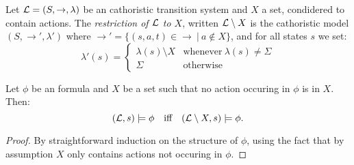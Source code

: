 

\begin{definition}
Let $\mathcal{L} = (S, \rightarrow, \lambda)$ be an cathoristic transition system
and $X$ a set, condidered to contain actions. The \emph{restriction of
  $\mathcal{L}$ to $X$}, written $\mathcal{L} \setminus X$ is the cathoristic model $(S,
\rightarrow', \lambda')$ where $\rightarrow' = \{(s, a, t) \in
\rightarrow \ |\ a \notin X\}$, and for all states $s$ we set:
\[
   \lambda'(s) 
        =
   \begin{cases}
       \lambda(s) \setminus  X & \text{whenever}\ \lambda(s) \neq \Sigma \\
       \Sigma & \text{otherwise}
   \end{cases}
\]

\end{definition}

\begin{lemma}\label{compactness:lemma:1717}
Let $\phi$ be an \cathoristic{} formula and $X$ be a set such that no action
occuring in $\phi$ is in $X$. Then:
\[
   (\mathcal{L}, s) \models \phi
      \quad\text{iff}\quad
   (\mathcal{L} \setminus X, s) \models \phi.
\]
\end{lemma}
\begin{proof}
By straightforward induction on the structure of $\phi$, using the
fact that by assumption $X$ only contains actions not occuring in
$\phi$.  
\end{proof}

